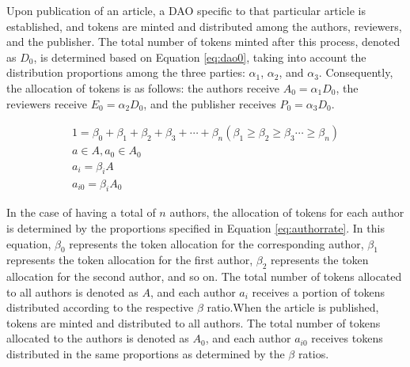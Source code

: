 \documentclass[lettersize,journal]{IEEEtran}
\begin{document}
Upon publication of an article, a DAO specific to that particular article is established, and tokens are minted and distributed among the authors, reviewers, and the publisher. The total number of tokens minted after this process, denoted as $D_0$, is determined based on Equation \ref{eq:dao0}, taking into account the distribution proportions among the three parties: $\alpha_1$, $\alpha_2$, and $\alpha_3$. Consequently, the allocation of tokens is as follows: the authors receive $A_0 = \alpha_1 D_0$, the reviewers receive $E_0 = \alpha_2 D_0$, and the publisher receives $P_0 = \alpha_3 D_0$.


\begin{equation}
  \begin{aligned}
    1 = \beta_0 + \beta_1 + \beta_2 + \beta_3 + \cdots + \beta_n (\beta_1 \geq  \beta_2 \geq \beta_3 \cdots \geq \beta_n)\\
    a \in A, a_0 \in A_0 \\
    a_{i} = \beta_i A \\
    a_{i0} = \beta_i A_0
  \end{aligned}
  \label{eq:authorrate}
\end{equation}

In the case of having a total of $n$ authors, the allocation of tokens for each author is determined by the proportions specified in Equation \ref{eq:authorrate}. In this equation, $\beta_0$ represents the token allocation for the corresponding author, $\beta_1$ represents the token allocation for the first author, $\beta_2$ represents the token allocation for the second author, and so on. The total number of tokens allocated to all authors is denoted as $A$, and each author $a_i$ receives a portion of tokens distributed according to the respective $\beta$ ratio.When the article is published, tokens are minted and distributed to all authors. The total number of tokens allocated to the authors is denoted as $A_0$, and each author $a_{i0}$ receives tokens distributed in the same proportions as determined by the $\beta$ ratios.
\end{document}
